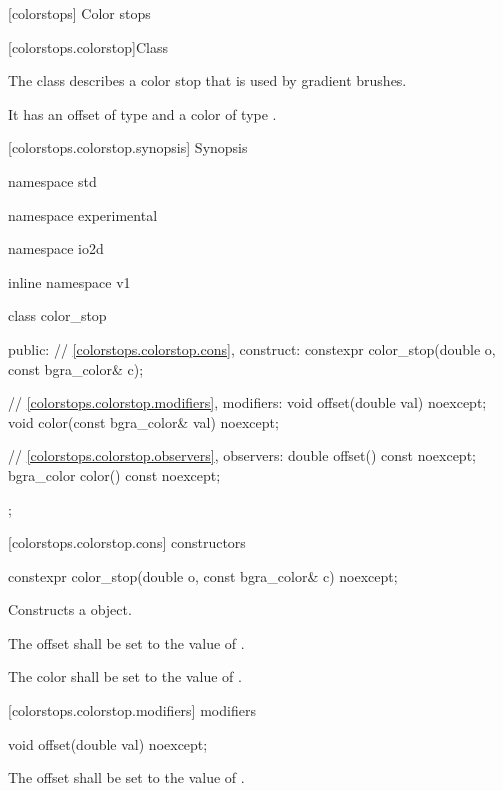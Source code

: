  [colorstops] {Color stops}

 [colorstops.colorstop]{Class }

\pnum
{}
The class  describes a color stop that is used by gradient brushes.

\pnum
It has an offset of type  and a color of type .

 [colorstops.colorstop.synopsis] { Synopsis}

\begin{codeblock}
namespace std { namespace experimental { namespace io2d { inline namespace v1 {
  class color_stop {
  public:
  	// \ref{colorstops.colorstop.cons}, construct:
    constexpr color_stop(double o, const bgra_color& c);
    
    // \ref{colorstops.colorstop.modifiers}, modifiers:
    void offset(double val) noexcept;
	void color(const bgra_color& val) noexcept;
	
    // \ref{colorstops.colorstop.observers}, observers:
	double offset() const noexcept;
	bgra_color color() const noexcept;
  };
} } } }
\end{codeblock}

 [colorstops.colorstop.cons]{ constructors}

\begin{itemdecl}
	constexpr color_stop(double o, const bgra_color& c) noexcept;
\end{itemdecl}
\begin{itemdescr}
	\pnum
	\effects
	Constructs a  object.
	
	\pnum
	The offset shall be set to the value of .
	
	\pnum
	The color shall be set to the value of .
\end{itemdescr}

 [colorstops.colorstop.modifiers]{ modifiers}

\begin{itemdecl}
	void offset(double val) noexcept;
\end{itemdecl}
\begin{itemdescr}
	\pnum
	\effects
	The offset shall be set to the value of .
\end{itemdescr}

